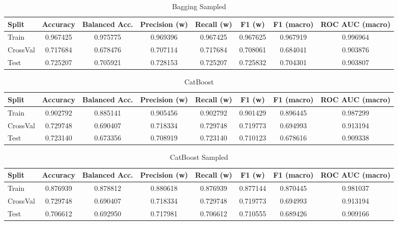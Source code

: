 \begin{table}[H]
	\centering
	\caption{Bagging Sampled}
	\begin{adjustbox}{max width=\textwidth}
		\begin{tabular}{lccccccc}
			\toprule
			Split & Accuracy & Balanced Acc. & Precision (w) & Recall (w) & F1 (w) & F1 (macro) & ROC AUC (macro) \\
			\midrule
			Train & 0.967425 & 0.975775 & 0.969396 & 0.967425 & 0.967625 & 0.967919 & 0.996964 \\
			CrossVal & 0.717684 & 0.678476 & 0.707114 & 0.717684 & 0.708061 & 0.684041 & 0.903876 \\
			Test & 0.725207 & 0.705921 & 0.728153 & 0.725207 & 0.725832 & 0.704301 & 0.903807 \\
			\bottomrule
		\end{tabular}
	\end{adjustbox}
\end{table}

\begin{table}[H]
	\centering
	\caption{CatBoost}
	\begin{adjustbox}{max width=\textwidth}
		\begin{tabular}{lccccccc}
			\toprule
			Split & Accuracy & Balanced Acc. & Precision (w) & Recall (w) & F1 (w) & F1 (macro) & ROC AUC (macro) \\
			\midrule
			Train & 0.902792 & 0.885141 & 0.905456 & 0.902792 & 0.901429 & 0.896445 & 0.987299 \\
			CrossVal & 0.729748 & 0.690407 & 0.718334 & 0.729748 & 0.719773 & 0.694993 & 0.913194 \\
			Test & 0.723140 & 0.673356 & 0.708919 & 0.723140 & 0.710123 & 0.678616 & 0.909338 \\
			\bottomrule
		\end{tabular}
	\end{adjustbox}
\end{table}

\begin{table}[H]
	\centering
	\caption{CatBoost Sampled}
	\begin{adjustbox}{max width=\textwidth}
		\begin{tabular}{lccccccc}
			\toprule
			Split & Accuracy & Balanced Acc. & Precision (w) & Recall (w) & F1 (w) & F1 (macro) & ROC AUC (macro) \\
			\midrule
			Train & 0.876939 & 0.878812 & 0.880618 & 0.876939 & 0.877144 & 0.870445 & 0.981037 \\
			CrossVal & 0.729748 & 0.690407 & 0.718334 & 0.729748 & 0.719773 & 0.694993 & 0.913194 \\
			Test & 0.706612 & 0.692950 & 0.717981 & 0.706612 & 0.710555 & 0.689426 & 0.909166 \\
			\bottomrule
		\end{tabular}
	\end{adjustbox}
\end{table}

